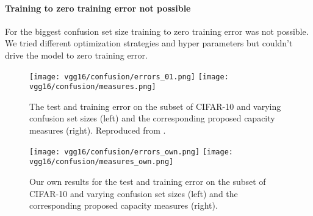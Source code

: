 \paragraph{Training to zero training error not possible}
For the biggest confusion set size training to zero training error was not possible. We tried different optimization strategies and hyper parameters but couldn't drive the model to zero training error.
%
\begin{figure}
	\centering
	\texttt{[image: vgg16/confusion/errors\_01.png]}
	\texttt{[image: vgg16/confusion/measures.png]}
	\caption{The test and training error on the subset of CIFAR-10 and varying confusion set sizes (left) and the corresponding proposed capacity measures (right). Reproduced from \cite{neyshabur2017exploring}.}	
	\label{fig:confusion-paper}
\end{figure}
\begin{figure}
	\centering
	\texttt{[image: vgg16/confusion/errors\_own.png]}
	\texttt{[image: vgg16/confusion/measures\_own.png]}
	\caption{Our own results for the test and training error on the subset of CIFAR-10 and varying confusion set sizes (left) and the corresponding proposed capacity measures (right).}	
	\label{fig:confusion-own}
\end{figure}
%
%
%
%
%
%
%
%
